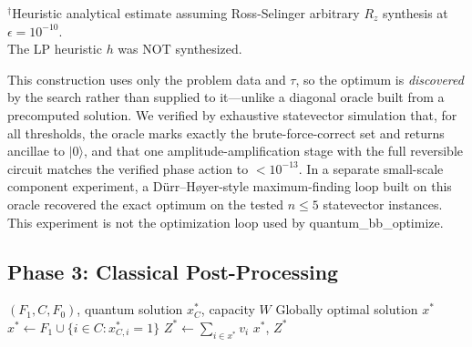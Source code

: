 \documentclass[conference]{IEEEtran} \IEEEoverridecommandlockouts
\begin{document}
\begin{table}[htbp]
\caption{Exact Logical Predicate Resources and Analytical T-Count Estimates}
\label{tab:oracle}
\begin{center}
\begin{flushleft}
\footnotesize
$^\dagger$Heuristic analytical estimate assuming Ross-Selinger arbitrary $R_z$ synthesis at $\epsilon = 10^{-10}$.\\
The LP heuristic $h$ was NOT synthesized.
\end{flushleft}
\end{center}
\end{table}

This construction uses only the problem data and $\tau$, so the optimum is \textit{discovered} by the search rather than supplied to it---unlike a diagonal oracle built from a precomputed solution. We verified by exhaustive statevector simulation that, for all thresholds, the oracle marks exactly the brute-force-correct set and returns ancillae to $|0\rangle$, and that one amplitude-amplification stage with the full reversible circuit matches the verified phase action to $<10^{-13}$. In a separate small-scale component experiment, a D\"urr--H{\o}yer-style maximum-finding loop built on this oracle recovered the exact optimum on the tested $n \le 5$ statevector instances. This experiment is not the optimization loop used by quantum\_bb\_optimize.

\subsection{Phase 3: Classical Post-Processing}

\begin{algorithm}[h]
\caption{Classical Reconstruction}
\label{alg:postprocess}
\begin{algorithmic}[1]
\REQUIRE $(F_1, C, F_0)$, quantum solution $x^*_C$, capacity $W$
\ENSURE Globally optimal solution $x^*$
\STATE $x^* \leftarrow F_1 \cup \{i \in C : x^*_{C,i} = 1\}$
\STATE $Z^* \leftarrow \sum_{i \in x^*} v_i$
\RETURN $x^*$, $Z^*$
\end{algorithmic}
\end{algorithm}
\end{document}
